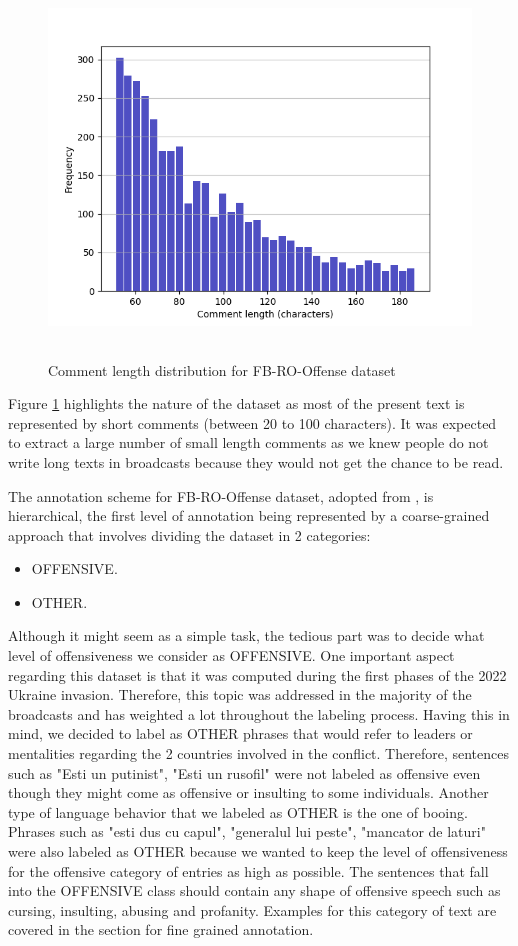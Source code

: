 \documentclass[12pt,a4paper]{report}
\begin{document}
\begin{figure}[H]
\centering
\includegraphics[height=10cm]{pics/FB-RO-OFFENSE-Metrics3.png}
  \caption{Comment length distribution for FB-RO-Offense dataset}
  \label{fig:RO-FB-Metrics}
\end{figure}

Figure \ref{fig:RO-FB-Metrics} highlights the nature of the dataset as most of the present text is represented by short comments (between 20 to 100 characters). It was expected to extract a large number of small length comments as we knew people do not write long texts in broadcasts because they would not get the chance to be read.

The annotation scheme for FB-RO-Offense dataset, adopted from \citet{wiegand2018overview}, is hierarchical, the first level of annotation being represented by a coarse-grained approach that involves dividing the dataset in 2 categories:
\begin{itemize}
    \item OFFENSIVE.
    \item OTHER.
\end{itemize}
Although it might seem as a simple task, the tedious part was to decide what level of offensiveness we consider as OFFENSIVE. One important aspect regarding this dataset is that it was computed during the first phases of the 2022 Ukraine invasion. Therefore, this topic was addressed in the majority of the broadcasts and has weighted a lot throughout the labeling process. Having this in mind, we decided to label as OTHER phrases that would refer to leaders or mentalities regarding the 2 countries involved in the conflict. Therefore, sentences such as "Esti un putinist", "Esti un rusofil" were not labeled as offensive even though they might come as offensive or insulting to some individuals. Another type of language behavior that we labeled as OTHER is the one of booing. Phrases such as "esti dus cu capul", "generalul lui peste", "mancator de laturi" were also labeled as OTHER because we wanted to keep the level of offensiveness for the offensive category of entries as high as possible.
The sentences that fall into the OFFENSIVE class should contain any shape of offensive speech such as cursing, insulting, abusing and profanity. Examples for this category of text are covered in the section for fine grained annotation.
\end{document}
